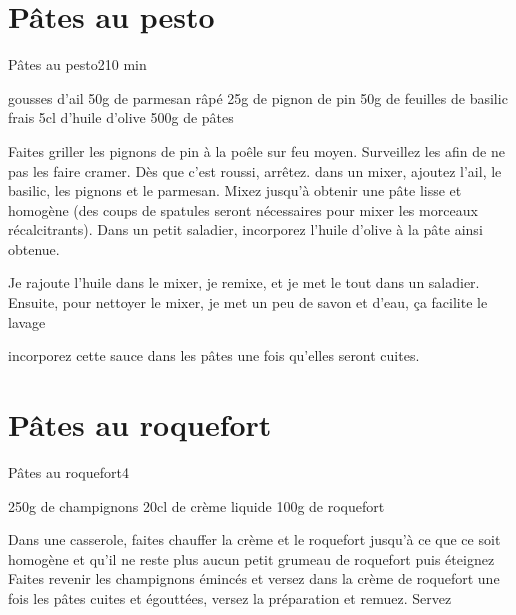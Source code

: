 {\section{Pâtes au pesto}
\begin{recette}{Pâtes au pesto}{2}{10 min}{}
\begin{ingredients}
 gousses d'ail
\ingredient 50g de parmesan râpé
\ingredient 25g de pignon de pin
\ingredient 50g de feuilles de basilic frais
\ingredient 5cl d'huile d'olive
\ingredient 500g de pâtes
\end{ingredients}

\begin{preparation}
\etape Faites griller les pignons de pin à la poêle sur feu moyen. Surveillez les afin de ne pas les faire cramer. Dès que 
c'est roussi, arrêtez.
\etape dans un mixer, ajoutez l'ail, le basilic, les pignons et le parmesan. Mixez jusqu'à obtenir une pâte lisse et homogène 
(des coups de spatules seront nécessaires pour mixer les morceaux récalcitrants). 
\etape Dans un petit saladier, incorporez l'huile d'olive à la pâte ainsi obtenue. 
\begin{remarque}
Je rajoute l'huile dans le mixer, je remixe, et je met le tout dans un saladier. Ensuite, pour nettoyer le mixer, je met un peu 
de savon et d'eau, ça facilite le lavage
\end{remarque}
\etape incorporez cette sauce dans les pâtes une fois qu'elles seront cuites. 

\end{preparation}
\end{recette}

\section{Pâtes au roquefort}
\begin{recette}{Pâtes au roquefort}{4}{}{}
\begin{ingredients}
\ingredient 250g de champignons
\ingredient 20cl de crème liquide
\ingredient 100g de roquefort
\end{ingredients}

\begin{preparation}
\etape Dans une casserole, faites chauffer la crème et le roquefort jusqu'à ce que ce soit homogène et qu'il ne reste plus 
aucun petit grumeau de roquefort puis éteignez
\etape Faites revenir les champignons émincés et versez dans la crème de roquefort
\etape une fois les pâtes cuites et égouttées, versez la préparation et remuez. 
\etape Servez
\end{preparation}
\end{recette}

}

